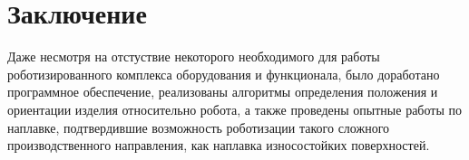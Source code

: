 \chapter{Заключение}
Даже несмотря на отстуствие некоторого необходимого для работы роботизированного комплекса оборудования и функционала, было доработано программное обеспечение, реализованы алгоритмы определения положения и ориентации изделия относительно робота, а также проведены опытные работы по наплавке, подтвердившие возможность роботизации такого сложного производственного направления, как наплавка износостойких поверхностей.